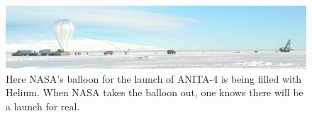 \begin{figure}
\centering
\includegraphics[width=1.0\textwidth]
{figures/launch_balloon.jpg}
\caption{Here NASA's balloon for the launch of ANITA-4 is being filled with Helium. When NASA takes the balloon out, one knows there will be a launch for real.}
\label{balloon_filled}
\end{figure}

\begin{figure}
\centering
{}
\end{figure}
